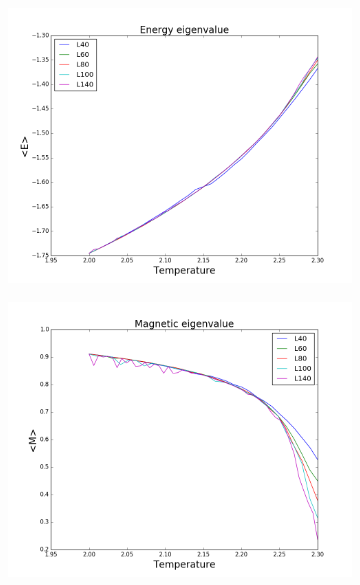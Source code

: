 \documentclass{article}
\begin{document}
\begin{figure}[H]
\centering
\begin{subfigure}{0.49 \textwidth}
\includegraphics[scale=0.29]{../figures/task_e/energyeig.png}
\label{fig:cEeig}
\end{subfigure}
\begin{subfigure}{0.49 \textwidth}
\centering
\includegraphics[scale=0.29]{../figures/task_e/Mageig.png}
\label{fig:cMeig} \\
\end{subfigure}
\begin{subfigure}{0.49 \textwidth}

\end{subfigure}
\end{figure}
\end{document}
